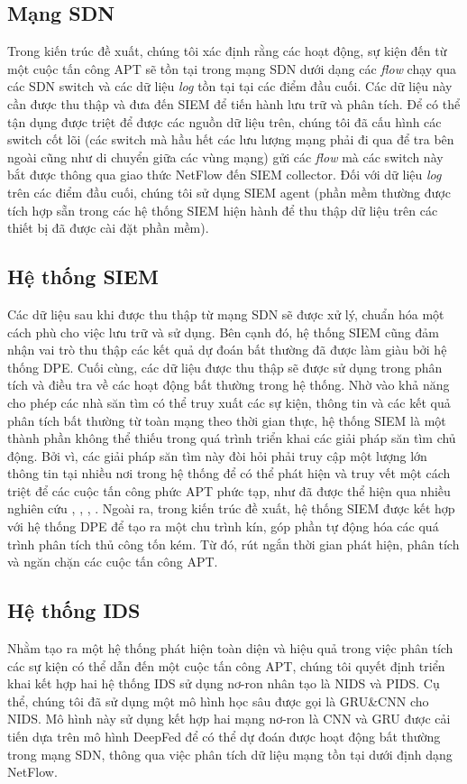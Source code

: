 \subsection{Mạng SDN}
Trong kiến trúc đề xuất, chúng tôi xác định rằng các hoạt động, sự kiện đến từ một cuộc tấn công APT sẽ tồn tại trong mạng SDN dưới dạng các \textit{flow} chạy qua các SDN switch và các dữ liệu \textit{log} tồn tại tại các điểm đầu cuối. Các dữ liệu này cần được thu thập và đưa đến SIEM để tiến hành lưu trữ và phân tích. Để có thể tận dụng được triệt để được các nguồn dữ liệu trên, chúng tôi đã cấu hình các switch cốt lõi (các switch mà hầu hết các lưu lượng mạng phải đi qua để tra bên ngoài cũng như di chuyển giữa các vùng mạng) gửi các \textit{flow} mà các switch này bắt được thông qua giao thức NetFlow đến SIEM collector. Đối với dữ liệu \textit{log} trên các điểm đầu cuối, chúng tôi sử dụng SIEM agent (phần mềm thường được tích hợp sẵn trong các hệ thống SIEM hiện hành để thu thập dữ liệu trên các thiết bị đã được cài đặt phần mềm).

\subsection{Hệ thống SIEM}
Các dữ liệu sau khi được thu thập từ mạng SDN sẽ được xử lý, chuẩn hóa một cách phù cho việc lưu trữ và sử dụng. Bên cạnh đó, hệ thống SIEM cũng đảm nhận vai trò thu thập các kết quả dự đoán bất thường đã được làm giàu bởi hệ thống DPE. Cuối cùng, các dữ liệu được thu thập sẽ được sử dụng trong phân tích và điều tra về các hoạt động bất thường trong hệ thống. Nhờ vào khả năng cho phép các nhà săn tìm có thể truy xuất các sự kiện, thông tin và các kết quả phân tích bất thường từ toàn mạng theo thời gian thực, hệ thống SIEM là một thành phần không thể thiếu trong quá trình triển khai các giải pháp săn tìm chủ động. Bởi vì, các giải pháp săn tìm này đòi hỏi phải truy cập một lượng lớn thông tin tại nhiều nơi trong hệ thống để có thể phát hiện và truy vết một cách triệt để các cuộc tấn công phức APT phức tạp, như đã được thể hiện qua nhiều nghiên cứu \cite{caltagirone2013diamond}, \cite{gunter2018practical}, \cite{ajmal2021offensive}, \cite{jadidi2021threat}. Ngoài ra, trong kiến trúc đề xuất, hệ thống SIEM được kết hợp với hệ thống DPE để tạo ra một chu trình kín, góp phần tự động hóa các quá trình phân tích thủ công tốn kém. Từ đó, rút ngắn thời gian phát hiện, phân tích và ngăn chặn các cuộc tấn công APT.

\subsection{Hệ thống IDS}
Nhằm tạo ra một hệ thống phát hiện toàn diện và hiệu quả trong việc phân tích các sự kiện có thể dẫn đến một cuộc tấn công APT, chúng tôi quyết định triển khai kết hợp hai hệ thống IDS sử dụng nơ-ron nhân tạo là NIDS và PIDS. Cụ thể, chúng tôi đã sử dụng một mô hình học sâu được gọi là GRU\&CNN cho NIDS. Mô hình này sử dụng kết hợp hai mạng nơ-ron là CNN và GRU được cải tiến dựa trên mô hình DeepFed để có thể dự đoán được hoạt động bất thường trong mạng SDN, thông qua việc phân tích dữ liệu mạng tồn tại dưới định dạng NetFlow.

